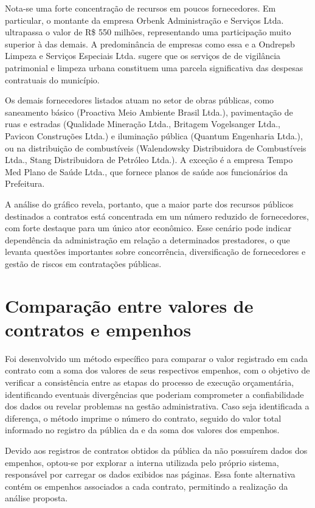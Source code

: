 \documentclass[
	12pt,				%
	oneside,			%
	a4paper,			%
	chapter=TITLE,		%
	section=TITLE,		%
	english,			%
	brazil				%
	]{abntex2}
\begin{document}
Nota-se uma forte concentração de recursos em poucos fornecedores. Em particular, o montante da empresa Orbenk Administração e Serviços Ltda. ultrapassa o valor de R\$ 550 milhões, representando uma participação muito superior à das demais. A predominância de empresas como essa e a Ondrepsb Limpeza e Serviços Especiais Ltda. sugere que os serviços de de vigilância patrimonial e limpeza urbana constituem uma parcela significativa das despesas contratuais do município.

Os demais fornecedores listados atuam no setor de obras públicas, como saneamento básico (Proactiva Meio Ambiente Brasil Ltda.), pavimentação de ruas e estradas (Qualidade Mineração Ltda., Britagem Vogelsanger Ltda., Pavicon Construções Ltda.) e iluminação pública (Quantum Engenharia Ltda.), ou na distribuição de combustíveis (Walendowsky Distribuidora de Combustíveis Ltda., Stang Distribuidora de Petróleo Ltda.). A exceção é a empresa Tempo Med Plano de Saúde Ltda., que fornece planos de saúde aos funcionários da Prefeitura.

A análise do gráfico revela, portanto, que a maior parte dos recursos públicos destinados a contratos está concentrada em um número reduzido de fornecedores, com forte destaque para um único ator econômico. Esse cenário pode indicar dependência da administração em relação a determinados prestadores, o que levanta questões importantes sobre concorrência, diversificação de fornecedores e gestão de riscos em contratações públicas.
 

\section*{Comparação entre valores de contratos e empenhos}

Foi desenvolvido um método específico para comparar o valor registrado em cada contrato com a soma dos valores de seus respectivos empenhos, com o objetivo de verificar a consistência entre as etapas do processo de execução orçamentária, identificando eventuais divergências que poderiam comprometer a confiabilidade dos dados ou revelar problemas na gestão administrativa. Caso seja identificada a diferença, o método imprime o número do contrato, seguido do valor total informado no registro da  pública da  e da soma dos valores dos empenhos.

Devido aos registros de contratos obtidos da  pública da  não possuírem dados dos empenhos, optou-se por explorar a  interna utilizada pelo próprio sistema, responsável por carregar os dados exibidos nas páginas. Essa fonte alternativa contém os empenhos associados a cada contrato, permitindo a realização da análise proposta.
\end{document}
